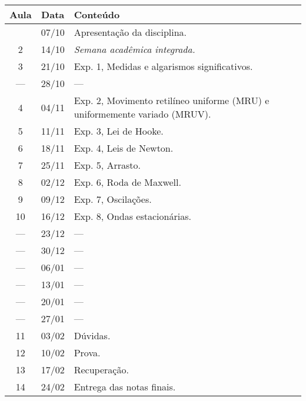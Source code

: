 \begin{center}
\begin{longtable}{ccp{70mm}}
\toprule
Aula & Data & Conteúdo \\
\midrule
\endhead
\bottomrule
\endfoot
  1 & 07/10 & Apresentação da disciplina. \\
  2 & 14/10 & \emph{Semana acadêmica integrada.} \\
  3 & 21/10 & Exp. 1, Medidas e algarismos significativos.   \\
--- & 28/10 & --- \\
  4 & 04/11 & Exp. 2, Movimento retilíneo uniforme (MRU) e uniformemente variado (MRUV). \\
  5 & 11/11 & Exp. 3, Lei de Hooke. \\
  6 & 18/11 & Exp. 4, Leis de Newton. \\
  7 & 25/11 & Exp. 5, Arrasto. \\
  8 & 02/12 & Exp. 6, Roda de Maxwell. \\
  9 & 09/12 & Exp. 7, Oscilações. \\
 10 & 16/12 & Exp. 8, Ondas estacionárias. \\
--- & 23/12 & --- \\
--- & 30/12 & --- \\
--- & 06/01 & --- \\
--- & 13/01 & --- \\
--- & 20/01 & --- \\ 
--- & 27/01 & --- \\
 11 & 03/02 & Dúvidas. \\
 12 & 10/02 & Prova.\\
 13 & 17/02 & Recuperação.\\
 14 & 24/02 & Entrega das notas finais.
\end{longtable}
\end{center}

\clearpage

